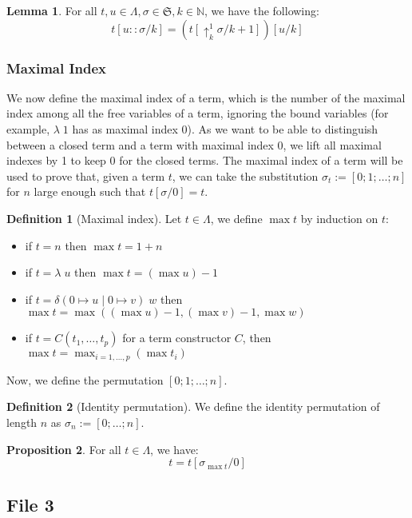 \documentclass{article}
\newcommand{\bN}[0]{\mathbb N}
\newcommand{\lift}[2]{\uparrow_{#1}^{#2}}
\newcommand{\deltacase}[3]{\delta(0\mapsto #1\mid 0 \mapsto #2)\;#3}
\newcommand{\fS}[0]{\mathfrak S}
\theoremstyle{definition}
\newtheorem{defi}{Definition}
\newtheorem{prop}{Proposition}[subsection]
\newtheorem{lem}[prop]{Lemma}
\begin{document}
\begin{lem}
    For all $t,u\in\Lambda,\sigma\in\fS,k\in\bN$, we have the following:
    $$t[u::\sigma/k] = (t[\lift k 1 \sigma / k + 1])[u/k]$$
\end{lem}

\subsubsection{Maximal Index}

We now define the maximal index of a term, which is the number of the maximal index among all the free
variables of a term, ignoring the bound variables (for example, $\lambda\;1$ has as maximal index 0). As we
want to be able to distinguish between a closed term and a term with maximal index 0, we lift all maximal
indexes by 1 to keep 0 for the closed terms. The maximal index of a term will be used to prove that, given a
term $t$, we can take the substitution $\sigma_t := [0;1;\ldots;n]$ for $n$ large enough such that
$t[\sigma/0] = t$.

\begin{defi}[Maximal index]
    Let $t \in \Lambda$, we define $\max t$ by induction on $t$:
    \begin{itemize}
        \item if $t = n$ then $\max t = 1 + n$
        \item if $t = \lambda\;u$ then $\max t = (\max u) - 1$
        \item if $t = \deltacase{u}{v}{w}$ then $\max t = \max((\max u) - 1, (\max v) - 1,\max w)$
        \item if $t = C(t_1,\ldots,t_p)$ for a term constructor $C$, then
        $\max t = \max_{i = 1,\ldots,p}(\max t_i)$
    \end{itemize}
\end{defi}

Now, we define the permutation $[0;1;\ldots;n]$.

\begin{defi}[Identity permutation]
    We define the identity permutation of length $n$ as $\sigma_n := [0;\ldots;n]$.
\end{defi}

\begin{prop}
    For all $t\in\Lambda$, we have:
    $$t = t[\sigma_{\max t} / 0]$$
\end{prop}

\subsection{File 3}
\end{document}
